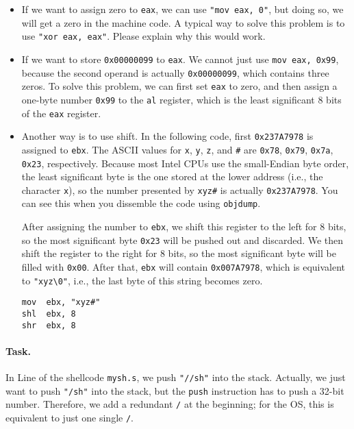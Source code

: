 \begin{itemize}
\item If we want to assign zero to \texttt{eax}, we 
can use \texttt{"mov eax, 0"}, but doing so,
we will get a zero in the machine code. A typical way
to solve this problem is to use \texttt{"xor eax, eax"}. 
Please explain why this would work.

\item If we want to store \texttt{0x00000099} to
\texttt{eax}. We cannot just use \texttt{mov eax, 0x99}, because 
the second operand is actually \texttt{0x00000099}, which contains three zeros. 
To solve this problem, we can first set \texttt{eax} to zero, and then
assign a one-byte number \texttt{0x99} to the \texttt{al} register, which 
is the least significant 8 bits of the \texttt{eax} register. 


\item Another way is to use shift. In the following code,
first \texttt{0x237A7978} is assigned to \texttt{ebx}.
The ASCII values for \texttt{x}, \texttt{y}, \texttt{z}, and \texttt{\#} are 
\texttt{0x78}, \texttt{0x79}, \texttt{0x7a}, \texttt{0x23}, 
respectively. Because most Intel CPUs use the small-Endian byte order,
the least significant byte is the one stored at the lower address (i.e., the
character \texttt{x}), so the number presented by \texttt{xyz\#} is 
actually \texttt{0x237A7978}. You can see this when you dissemble the 
code using \texttt{objdump}. 

After assigning the number to \texttt{ebx},  
we shift this register to the left 
for 8 bits, so the most significant byte \texttt{0x23} will 
be pushed out and discarded. 
We then shift the register to the right for 8 bits,
so the most significant byte will be filled with \texttt{0x00}. 
After that, \texttt{ebx} will contain \texttt{0x007A7978}, 
which is equivalent to \texttt{"xyz\textbackslash 0"}, i.e., the last
byte of this string becomes zero. 

\begin{lstlisting}
mov  ebx, "xyz#"
shl  ebx, 8
shr  ebx, 8
\end{lstlisting}
\end{itemize}


\paragraph{Task.}
In Line  of the shellcode \texttt{mysh.s}, 
we push \texttt{"//sh"} into the stack. Actually, we 
just want to push \texttt{"/sh"} into the stack, but 
the \texttt{push} instruction has to push a 32-bit number.
Therefore, we add a redundant \texttt{/} at the beginning; 
for the OS, this is equivalent to just one single \texttt{/}.  


